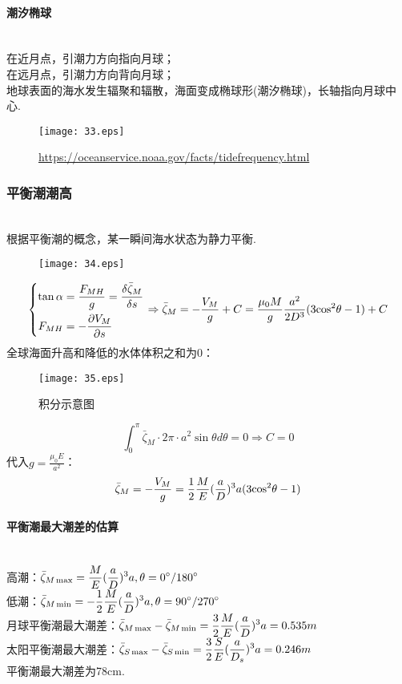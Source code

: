 \documentclass[a4paper,12pt]{article}
\begin{document}
    \paragraph{潮汐椭球}~{}\\
    在近月点，引潮力方向指向月球；\\
    在远月点，引潮力方向背向月球；\\
    地球表面的海水发生辐聚和辐散，海面变成椭球形(潮汐椭球)，长轴指向月球中心.
    \begin{figure}[H]
        \centering \texttt{[image: 33.eps]}
        \caption*{\url{https://oceanservice.noaa.gov/facts/tidefrequency.html}}
    \end{figure}
    \subsubsection{平衡潮潮高}~{}\\
    根据平衡潮的概念，某一瞬间海水状态为静力平衡.
    \begin{figure}[H]
        \centering \texttt{[image: 34.eps]}
        \caption*{}
    \end{figure}
    \[
        \left\{
            \begin{aligned}
                \tan \alpha&={F_{MH} \over g} =\frac{\delta\bar{\zeta}_M}{\delta s}\\
                F_{MH}&=-\frac{\partial V_M}{\partial s}
            \end{aligned}
        \right.
        \Rightarrow \bar{\zeta}_M=-\frac{V_M}{g}+C={{{\mu _0}M} \over g}{{{a^2}} \over {2{D^3}}}(3{\cos ^2}\theta  - 1) + C
    \]
    全球海面升高和降低的水体体积之和为0：
    \begin{figure}[H]
        \centering \texttt{[image: 35.eps]}
        \caption*{积分示意图}
    \end{figure}
    \[
        \int_0^\pi  {{{\bar \zeta }_M} \cdot } 2\pi  \cdot {a^2}\sin \theta d\theta  = 0\Rightarrow C=0
    \]
    代入$\displaystyle g=\frac{\mu_0 E}{a^2}$：
    \[
        {\bar \zeta _M} =  - {{{V_M}} \over g} = {1 \over 2}{M \over E}{({a \over D})^3}a(3{\cos ^2}\theta  - 1)
    \]
    \paragraph{平衡潮最大潮差的估算}~{}\\
    高潮：$\displaystyle {\bar \zeta _{M\max }} = {M \over E}{({a \over D})^3}a,\theta  = 0^\circ/180^\circ$\\
    低潮：$\displaystyle{\bar \zeta _{M\min }} =  - {1 \over 2}{M \over E}{({a \over D})^3}a,\theta  = 90^\circ/270^\circ$\\
    月球平衡潮最大潮差：$\displaystyle {\bar \zeta _{M\max }} - {\bar \zeta _{M\min }} = {3 \over 2}{M \over E}{({a \over D})^3}a = 0.535m$\\
    太阳平衡潮最大潮差：$\displaystyle {\bar \zeta _{S\max }} - {\bar \zeta _{S\min }} = {3 \over 2}{S \over E}{({a \over {{D_s}}})^3}a = 0.246m$\\
    平衡潮最大潮差为78cm.
\end{document}
